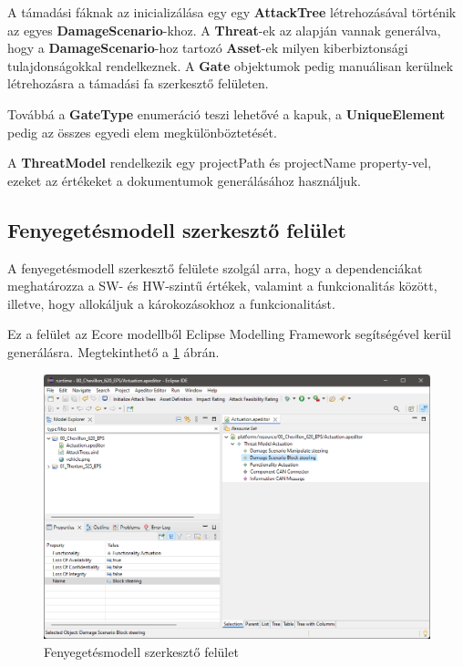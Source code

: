 A támadási fáknak az inicializálása egy egy \textbf{AttackTree} létrehozásával történik az egyes \textbf{DamageScenario}-khoz. A \textbf{Threat}-ek az alapján vannak generálva, hogy a \textbf{DamageScenario}-hoz tartozó \textbf{Asset}-ek milyen kiberbiztonsági tulajdonságokkal rendelkeznek. A \textbf{Gate} objektumok pedig manuálisan kerülnek létrehozásra a támadási fa szerkesztő felületen.

Továbbá a \textbf{GateType} enumeráció teszi lehetővé a kapuk, a \textbf{UniqueElement} pedig az összes egyedi elem megkülönböztetését.

A \textbf{ThreatModel} rendelkezik egy projectPath és projectName property-vel, ezeket az értékeket a dokumentumok generálásához használjuk.


\subsection{Fenyegetésmodell szerkesztő felület}

A fenyegetésmodell szerkesztő felülete szolgál arra, hogy a dependenciákat meghatározza a SW- és HW-szintű értékek, valamint a funkcionalitás között, illetve, hogy allokáljuk a károkozásokhoz a funkcionalitást.

Ez a felület az Ecore modellből Eclipse Modelling Framework segítségével kerül generálásra. Megtekinthető a \ref{fig:05_tmeditor} ábrán.

\begin{figure}[!ht]
	\centering
	\includegraphics[width=130mm, keepaspectratio]{figures/05_tmeditor_ds.png}
	\caption{Fenyegetésmodell szerkesztő felület}
	\label{fig:05_tmeditor}
\end{figure}

